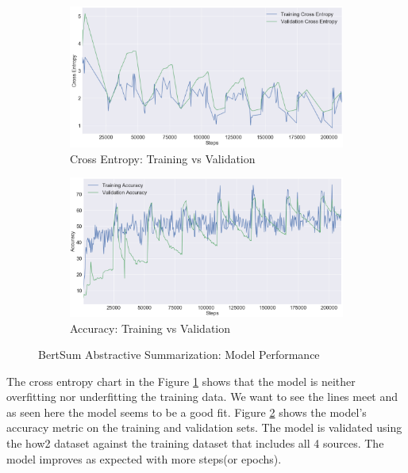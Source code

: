 \documentclass{article}
\begin{document}
\begin{figure}[H]
\begin{subfigure}{.6\textwidth}
  \centering
  \includegraphics[width=\linewidth]{xent.png}
  \caption{Cross Entropy: Training vs Validation}
  \label{fig:xent}
\end{subfigure}%
\begin{subfigure}{.6\textwidth}
  \centering
  \includegraphics[width=\linewidth]{accuracy.png}
  \caption{Accuracy: Training vs Validation}
  \label{fig:accuracy}
\end{subfigure}
\caption{BertSum Abstractive Summarization: Model Performance}
\label{fig:modelperf}
\end{figure}

The cross entropy chart  in the Figure \ref{fig:xent} shows that the model is neither overfitting nor underfitting the training data. We want to see the lines meet and as seen here the model seems to be a good fit. Figure \ref{fig:accuracy} shows the model’s accuracy metric on the training and validation sets. The model is validated using the how2 dataset against the training dataset that includes all 4 sources. The model improves as expected with more steps(or epochs). 
\end{document}
